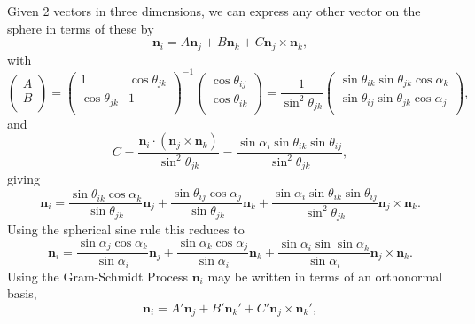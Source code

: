 \documentclass[fleqn,11pt,twoside]{article}
\theoremstyle{definition}
\begin{document}
Given 2 vectors in three dimensions, we can express any other vector on the sphere in terms of these by
\begin{equation}
\mathbf{n}_i=A\mathbf{n}_j+B\mathbf{n}_k+C\mathbf{n}_j\times\mathbf{n}_k,
\end{equation}
with
\begin{equation}
\left(\begin{array}{c}
A\\
B\\
\end{array}\right)
=\left(\begin{array}{cc}
1 & \cos\theta_{jk}\\
\cos\theta_{jk} & 1\\
\end{array}\right)^{-1}
\left(\begin{array}{c}
\cos\theta_{ij}\\
\cos\theta_{ik}\\
\end{array}\right)
=\frac{1}{\sin^2\theta_{jk}}\left(\begin{array}{c}
\sin\theta_{ik}\sin\theta_{jk}\cos\alpha_k\\
\sin\theta_{ij}\sin\theta_{jk}\cos\alpha_j\\
\end{array}\right),
\end{equation}
and
\begin{equation}
C=\frac{\mathbf{n}_i\cdot(\mathbf{n}_j\times\mathbf{n}_k)}{\sin^2\theta_{jk}}=\frac{\sin\alpha_i\sin\theta_{ik}\sin\theta_{ij}}{\sin^2\theta_{jk}},
\end{equation}
giving
\begin{equation}
\mathbf{n}_i=\frac{\sin\theta_{ik}\cos\alpha_k}{\sin\theta_{jk}}\mathbf{n}_j+\frac{\sin\theta_{ij}\cos\alpha_j}{\sin\theta_{jk}}\mathbf{n}_k+
\frac{\sin\alpha_i\sin\theta_{ik}\sin\theta_{ij}}{\sin^2\theta_{jk}}\mathbf{n}_j\times\mathbf{n}_k.
\end{equation}
Using the spherical sine rule this reduces to
\begin{equation}
\mathbf{n}_i=\frac{\sin\alpha_{j}\cos\alpha_k}{\sin\alpha_{i}}\mathbf{n}_j+\frac{\sin\alpha_{k}\cos\alpha_j}{\sin\alpha_{i}}\mathbf{n}_k+
\frac{\sin\alpha_i\sin\sin\alpha_k}{\sin\alpha_i}\mathbf{n}_j\times\mathbf{n}_k.
\end{equation}
Using the Gram-Schmidt Process $\mathbf{n}_i$ may be written in terms of an orthonormal basis,
\begin{equation}
\mathbf{n}_i=A'\mathbf{n}_{j}+B'\mathbf{n}_{k}'+C'\mathbf{n}_{j}\times\mathbf{n}_{k}',
\end{equation}
\end{document}
